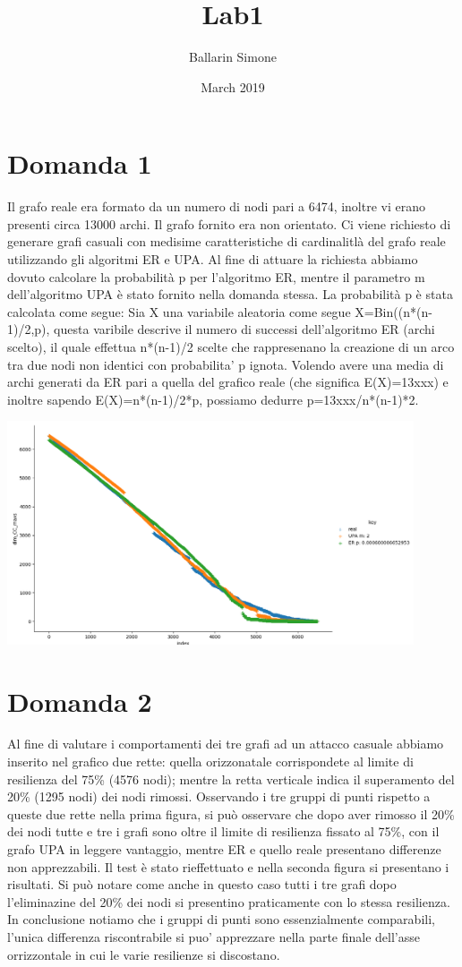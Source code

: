 \documentclass{article}
\title{Lab1}
\author{Ballarin Simone }
\date{March 2019}
\begin{document}
\maketitle

\section{Domanda 1}
Il grafo reale era formato da un numero di nodi pari a 6474, inoltre vi erano presenti circa 13000 archi. Il grafo fornito era non orientato. 
Ci viene richiesto di generare grafi casuali con medisime caratteristiche di cardinalitlà del grafo reale utilizzando gli algoritmi ER e UPA.
Al fine di attuare la richiesta abbiamo dovuto calcolare la probabilità p per l'algoritmo ER, mentre il parametro m dell'algoritmo UPA è stato fornito nella domanda stessa.
La probabilità p è stata calcolata come segue:
Sia X una variabile aleatoria come segue X=Bin((n*(n-1)/2,p), questa varibile descrive il numero di successi dell'algoritmo ER (archi scelto), il quale effettua n*(n-1)/2 scelte che rappresenano la creazione di un arco tra due nodi non identici con probabilita' p ignota.
Volendo avere una media di archi generati da ER pari a quella del grafico reale (che significa E(X)=13xxx) e inoltre sapendo E(X)=n*(n-1)/2*p, possiamo dedurre p=13xxx/n*(n-1)*2.

\includegraphics[width=0.9\textwidth]{Figure_4}

\newpage
\section{Domanda 2}
Al fine di valutare i comportamenti dei tre grafi ad un attacco casuale abbiamo inserito nel grafico due rette: quella orizzonatale corrispondete al limite di resilienza del 75\% (4576 nodi); mentre la retta verticale indica il superamento del 20\% (1295 nodi) dei nodi rimossi. 
Osservando i tre gruppi di punti rispetto a queste due rette nella prima figura, si può osservare che dopo aver rimosso il 20\% dei nodi tutte e tre i grafi sono oltre il limite di resilienza fissato al 75\%, con il grafo UPA in leggere vantaggio, mentre ER e quello reale presentano differenze non apprezzabili.
Il test è stato rieffettuato e nella seconda figura si presentano i risultati. Si può notare come anche in questo caso tutti i tre grafi dopo l'eliminazine del 20\% dei nodi si presentino praticamente con lo stessa resilienza.
In conclusione notiamo che i gruppi di punti sono essenzialmente comparabili, l'unica differenza riscontrabile si puo' apprezzare nella parte finale dell'asse orrizzontale in cui le varie resilienze si discostano.
\end{document}
